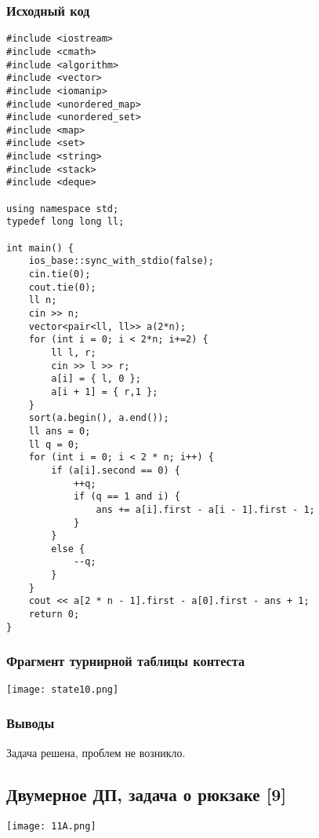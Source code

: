 \documentclass[12pt]{article}
\begin{document}
\subsubsection*{Исходный код}
\begin{lstlisting}
#include <iostream>
#include <cmath>
#include <algorithm>
#include <vector>
#include <iomanip>
#include <unordered_map>
#include <unordered_set>
#include <map>
#include <set>
#include <string>
#include <stack>
#include <deque>

using namespace std;
typedef long long ll;

int main() {
    ios_base::sync_with_stdio(false);
    cin.tie(0);
    cout.tie(0);
    ll n;
    cin >> n;
    vector<pair<ll, ll>> a(2*n);
    for (int i = 0; i < 2*n; i+=2) {
        ll l, r;
        cin >> l >> r;
        a[i] = { l, 0 };
        a[i + 1] = { r,1 };
    }
    sort(a.begin(), a.end());
    ll ans = 0;
    ll q = 0;
    for (int i = 0; i < 2 * n; i++) {
        if (a[i].second == 0) {
            ++q;
            if (q == 1 and i) {
                ans += a[i].first - a[i - 1].first - 1;
            }
        }
        else {
            --q;
        }
    }
    cout << a[2 * n - 1].first - a[0].first - ans + 1;
    return 0;
}
\end{lstlisting}
\subsubsection*{Фрагмент турнирной таблицы контеста}
\begin{center}
\texttt{[image: state10.png]}\newline\noindent
\end{center}

\subsubsection*{Выводы}
Задача решена, проблем не возникло.
\subsection*{ Двумерное ДП, задача о рюкзаке [9]}
\begin{center}
\texttt{[image: 11A.png]}
\end{center}
\end{document}
